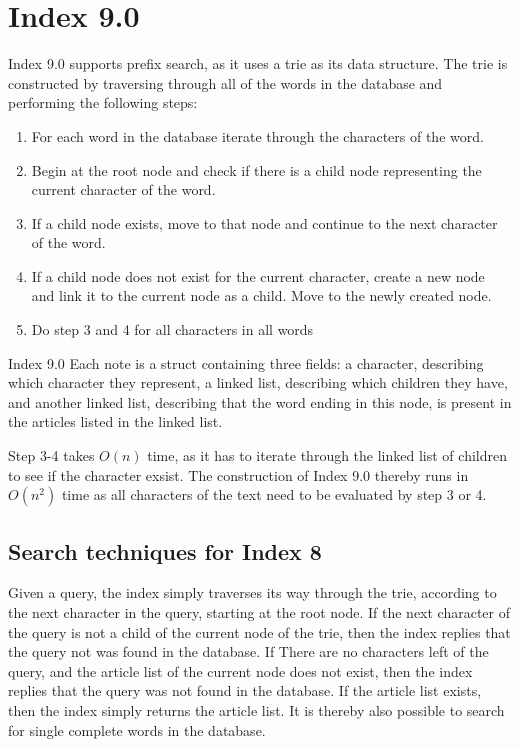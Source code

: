 \section{Index 9.0}
Index 9.0 supports prefix search, as it uses a trie as its data structure. The trie is constructed by traversing through all of the words in the database and performing the following steps:

\begin{enumerate}
  \item For each word in the database iterate through the characters of the word.
  \item Begin at the root node and check if there is a child node representing the current character of the word. 
  \item If a child node exists, move to that node and continue to the next character of the word.
  \item If a child node does not exist for the current character, create a new node and link it to the current node as a child. Move to the newly created node.
  \item Do step 3 and 4 for all characters in all words
\end{enumerate}

Index 9.0 Each note is a struct containing three fields: a character, describing which character they represent, a linked list, describing which children they have, and another linked list, describing that the word ending in this node, is present in the articles listed in the linked list.

Step 3-4 takes $O(n)$ time, as it has to iterate through the linked list of children to see if the character exsist. The construction of Index 9.0 thereby runs in $O(n^2)$ time as all characters of the text need to be evaluated by step 3 or 4.  

\subsection{Search techniques for Index 8}
Given a query, the index simply traverses its way through the trie, according to the next character in the query, starting at the root node. If the next character of the query is not a child of the current node of the trie, then the index replies that the query not was found in the database. If There are no characters left of the query, and the article list of the current node does not exist, then the index replies that the query was not found in the database. If the article list exists, then the index simply returns the article list. It is thereby also possible to search for single complete words in the database.

